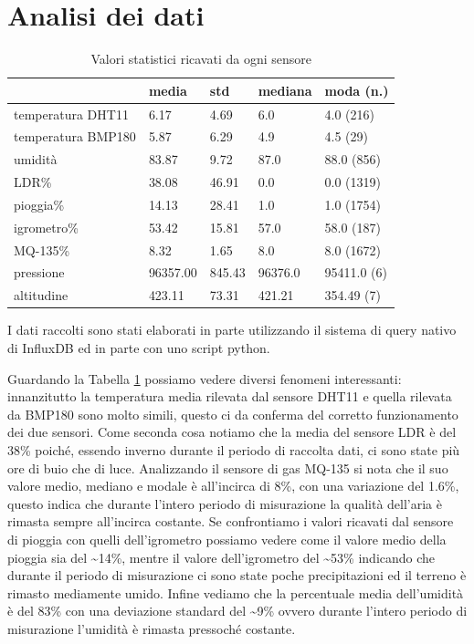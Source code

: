\documentclass[fleqn, 12pt]{SelfArx}
\begin{document}
\section{Analisi dei dati}

\begin{table}[htb]
  \centering
  \begin{tabular}{ l l l l l }
    \hline
    & media & std & mediana & moda (n.) \\
    \hline
    temperatura DHT11 & 6.17 & 4.69 & 6.0 & 4.0 (216) \\
    temperatura BMP180 & 5.87 & 6.29 & 4.9 & 4.5 (29) \\
    umidità & 83.87 & 9.72 & 87.0 & 88.0 (856) \\
    LDR\% & 38.08 & 46.91 & 0.0 & 0.0 (1319) \\
    pioggia\% & 14.13 & 28.41 & 1.0 & 1.0 (1754) \\
    igrometro\% & 53.42 & 15.81 & 57.0 & 58.0 (187) \\
    MQ-135\% & 8.32 & 1.65 & 8.0 & 8.0 (1672) \\
    pressione & 96357.00 & 845.43 & 96376.0 & 95411.0 (6) \\
    altitudine & 423.11 & 73.31 & 421.21 & 354.49 (7) \\
    \hline
  \end{tabular}
  \caption{ Valori statistici ricavati da ogni sensore }
  \label{tab:all_data_stats}
\end{table}

I dati raccolti sono stati elaborati in parte utilizzando il sistema di query nativo di InfluxDB\cite{flux} ed in parte con uno script python\cite{python}.

Guardando la Tabella \ref{tab:all_data_stats} possiamo vedere diversi fenomeni interessanti: innanzitutto la temperatura media rilevata dal sensore DHT11 e quella rilevata da BMP180 sono molto simili, 
questo ci da conferma del corretto funzionamento dei due sensori. Come seconda cosa notiamo che la media del sensore LDR è del 38\% poiché, essendo inverno durante il periodo di raccolta dati, 
ci sono state più ore di buio che di luce. Analizzando il sensore di gas MQ-135 si nota che il suo valore medio, mediano e modale è all'incirca di 8\%, con una variazione del 1.6\%, questo indica 
che durante l'intero periodo di misurazione la qualità dell'aria è rimasta sempre all'incirca costante. Se confrontiamo i valori ricavati dal sensore di pioggia con quelli dell'igrometro possiamo vedere 
come il valore medio della pioggia sia del \textasciitilde14\%, mentre il valore dell'igrometro del
\textasciitilde53\% indicando che durante il periodo di misurazione ci sono state poche precipitazioni ed il terreno è rimasto mediamente umido. Infine vediamo che la percentuale media dell'umidità è 
del 83\% con una deviazione standard del \textasciitilde9\% ovvero durante l'intero periodo di misurazione l'umidità è rimasta pressoché costante.
\end{document}
